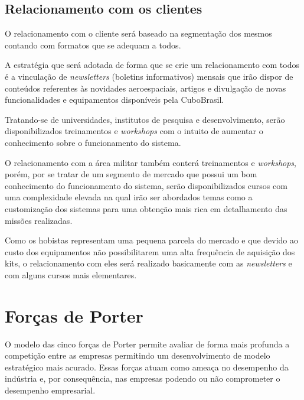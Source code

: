 \documentclass[
	12pt,				%
	openright,			%
	oneside,			%
	a4paper,			%
	english,			%
	french,				%
	spanish,			%
	brazil				%
	]{abntex2}
\begin{document}
\subsection[Relacionamento com os clientes]{Relacionamento com os clientes}
	
	O relacionamento com o cliente será baseado na segmentação dos mesmos contando com formatos que se adequam a todos.
	 
	A estratégia que será adotada de forma que se crie um relacionamento com todos é a vinculação de \textit{newsletters} (boletins informativos) mensais que irão dispor de conteúdos referentes às novidades aeroespaciais, artigos e divulgação de novas funcionalidades e equipamentos disponíveis pela CuboBrasil.

	Tratando-se de universidades, institutos de pesquisa e desenvolvimento, serão disponibilizados treinamentos e \textit{workshops} com o intuito de aumentar o conhecimento sobre o funcionamento do sistema.
	
	O relacionamento com a área militar também conterá treinamentos e \textit{workshops}, porém, por se tratar de um segmento de mercado que possui um bom conhecimento do funcionamento do sistema, serão disponibilizados cursos com uma complexidade elevada na qual irão ser abordados temas como a customização dos sistemas para uma obtenção mais rica em detalhamento das missões realizadas.
	
	Como os hobistas representam uma pequena parcela do mercado e que devido ao custo dos equipamentos não possibilitarem uma alta frequência de aquisição dos kits, o relacionamento com eles será realizado basicamente com as \textit{newsletters} e com alguns cursos mais elementares.

\section[Forças de Porter]{Forças de Porter}

	O modelo das cinco forças de Porter	permite avaliar de forma mais profunda a competição entre as empresas permitindo um desenvolvimento de modelo estratégico mais acurado. Essas forças atuam como ameaça no desempenho da indústria e, por consequência, nas empresas podendo ou não comprometer o desempenho empresarial.
\end{document}

